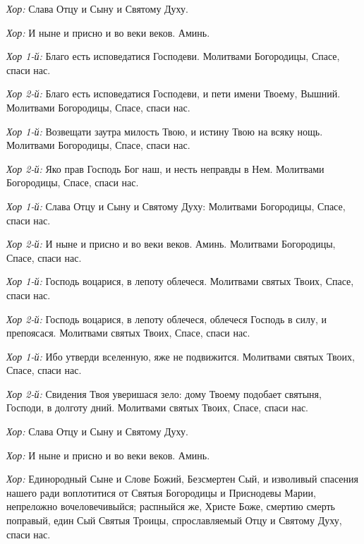 \begin{mymulticols}
{\itshape Хор:} Слава Отцу и Сыну и Святому Духу. 


{\itshape Хор:} И ныне и присно и во веки веков. Аминь. 






{\itshape Хор 1-й:} Благо есть исповедатися Господеви. Молитвами Богородицы, Спасе, спаси нас. 


{\itshape Хор 2-й:} Благо есть исповедатися Господеви, и пети имени Твоему, Вышний. Молитвами Богородицы, Спасе, спаси нас. 


{\itshape Хор 1-й:} Возвещати заутра милость Твою, и истину Твою на всяку нощь. Молитвами Богородицы, Спасе, спаси нас. 


{\itshape Хор 2-й:} Яко прав Господь Бог наш, и несть неправды в Нем. Молитвами Богородицы, Спасе, спаси нас.


{\itshape Хор 1-й:} Слава Отцу и Сыну и Святому Духу: Молитвами Богородицы, Спасе, спаси нас.


{\itshape Хор 2-й:} И ныне и присно и во веки веков. Аминь. Молитвами Богородицы, Спасе, спаси нас.



{\itshape Хор 1-й:} Господь воцарися, в лепоту облечеся. Молитвами святых Твоих, Спасе, спаси нас. 


{\itshape Хор 2-й:} Господь воцарися, в лепоту облечеся, облечеся Господь в силу, и препоясася. Молитвами святых Твоих, Спасе, спаси нас.


{\itshape Хор 1-й:} Ибо утверди вселенную, яже не подвижится. Молитвами святых Твоих, Спасе, спаси нас.


{\itshape Хор 2-й:} Свидения Твоя уверишася зело: дому Твоему подобает святыня, Господи, в долготу дний. Молитвами святых Твоих, Спасе, спаси нас.

{\itshape Хор:} Слава Отцу и Сыну и Святому Духу. 


{\itshape Хор:} И ныне и присно и во веки веков. Аминь. 




{\itshape Хор:} Единородный Сыне и Слове Божий, Безсмертен Сый, и изволивый спасения нашего ради воплотитися от Святыя Богородицы и Приснодевы Марии, непреложно вочеловечивыйся; распныйся же, Христе Боже, смертию смерть поправый, един Сый Святыя Троицы, спрославляемый Отцу и Святому Духу, спаси нас. 




\end{mymulticols}
